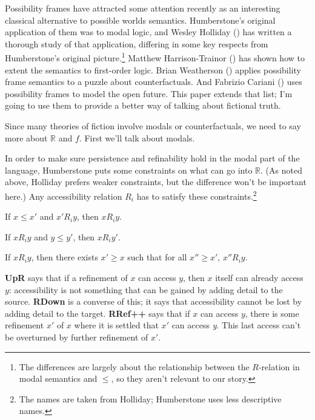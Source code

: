 \documentclass[
  11pt,
  letterpaper,
  DIV=11,
  numbers=noendperiod,
  twoside]{scrartcl}
\providecommand{\tightlist}{%
  \setlength{\itemsep}{0pt}\setlength{\parskip}{0pt}}
\begin{document}
Possibility frames have attracted some attention recently as an
interesting classical alternative to possible worlds semantics.
Humberstone's original application of them was to modal logic, and
Wesley Holliday () has written a
thorough study of that application, differing in some key respects from
Humberstone's original picture.\footnote{The differences are largely
  about the relationship between the \(R\)-relation in modal semantics
  and \(\leqslant\), so they aren't relevant to our story.} Matthew
Harrison-Trainor () has shown
how to extent the semantics to first-order logic. Brian Weatherson
() applies possibility frame
semantics to a puzzle about counterfactuals. And Fabrizio Cariani
() uses possibility frames to model the
open future. This paper extends that list; I'm going to use them to
provide a better way of talking about fictional truth.

Since many theories of fiction involve modals or counterfactuals, we
need to say more about \(\mathbb{R}\) and \(f\). First we'll talk about
modals.

In order to make sure persistence and refinability hold in the modal
part of the language, Humberstone puts some constraints on what can go
into \(\mathbb{R}\). (As noted above, Holliday prefers weaker
constraints, but the difference won't be important here.) Any
accessibility relation \(R_i\) has to satisfy these
constraints.\footnote{The names are taken from Holliday; Humberstone
  uses less descriptive names.}

\begin{description}
\tightlist
\item[\textbf{UpR}:]
If \(x \leqslant x'\) and \(x' R_i y\), then \(x R_i y\).
\item[\textbf{RDown}:]
If \(x R_i y\) and \(y \leqslant y'\), then \(x R_i y'\).
\item[\textbf{RRef++}:]
If \(x R_i y\), then there exists \(x' \geqslant x\) such that for all
\(x'' \geqslant x'\), \(x'' R_i y\).
\end{description}

\textbf{UpR} says that if a refinement of \(x\) can access \(y\), then
\(x\) itself can already access \(y\): accessibility is not something
that can be gained by adding detail to the source. \textbf{RDown} is a
converse of this; it says that accessibility cannot be lost by adding
detail to the target. \textbf{RRef++} says that if \(x\) can access
\(y\), there is some refinement \(x'\) of \(x\) where it is settled that
\(x'\) can access \emph{y}. This last access can't be overturned by
further refinement of \(x'\).
\end{document}
